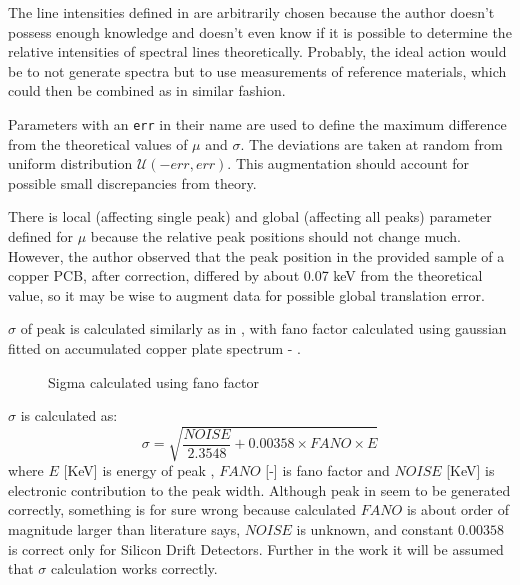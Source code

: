 The line intensities defined in  are arbitrarily chosen because the author doesn't possess enough knowledge and doesn't even know if it is possible to determine the relative intensities of spectral lines theoretically. 
Probably, the ideal action would be to not generate spectra but to use measurements of reference materials, which could then be combined as in similar fashion.

Parameters with an \texttt{err} in their name are used to define the maximum difference from the theoretical values of $\mu$ and $\sigma$. 
The deviations are taken at random from uniform distribution $\mathcal{U}(-err, err)$.
This augmentation should account for possible small discrepancies from theory. 

There is local (affecting single peak) and global (affecting all peaks) parameter defined for $\mu$ because the relative peak positions should not change much. 
However, the author observed that the peak position in the provided sample of a copper PCB, after correction, differed by about 0.07 keV from the theoretical value, so it may be wise to augment data for possible global translation error.

$\sigma$ of peak is calculated similarly as in \cite{Jones2022}, with fano factor calculated using gaussian fitted on accumulated copper plate spectrum - .

\begin{figure}[H] 
  \centering     
   
  \caption{Sigma calculated using fano factor}
  \label{fig:fano-factor}
\end{figure}

$\sigma$ is calculated as: \[\sigma = \sqrt{\frac{NOISE}{2.3548} + 0.00358 \times FANO \times E}\]
where $E$ [KeV] is energy of peak , $FANO$ [-] is fano factor and $NOISE$ [KeV] is electronic contribution to the peak width.
Although peak in  seem to be generated correctly, something is for sure wrong because calculated $FANO$ is about order of magnitude larger than literature says, $NOISE$ is unknown, and constant $0.00358$ is correct only for Silicon Drift Detectors.
Further in the work it will be assumed that $\sigma$ calculation works correctly.

